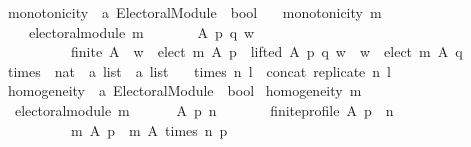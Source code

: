 \begin{isabellebody}
{\isafolddocument}%
%
\isadelimdocument
%
\endisadelimdocument
{}\isamarkupfalse%
\ monotonicity\ {\isacharcolon}{\kern0pt}{\isacharcolon}{\kern0pt}\ {\isachardoublequoteopen}{\isacharprime}{\kern0pt}a\ Electoral{\isacharunderscore}{\kern0pt}Module\ {\isasymRightarrow}\ bool{\isachardoublequoteclose}\ \isanewline
\ \ {\isachardoublequoteopen}monotonicity\ m\ {\isasymequiv}\isanewline
\ \ \ \ electoral{\isacharunderscore}{\kern0pt}module\ m\ {\isasymand}\isanewline
\ \ \ \ \ \ {\isacharparenleft}{\kern0pt}{\isasymforall}A\ p\ q\ w{\isachardot}{\kern0pt}\isanewline
\ \ \ \ \ \ \ \ \ \ {\isacharparenleft}{\kern0pt}finite\ A\ {\isasymand}\ w\ {\isasymin}\ elect\ m\ A\ p\ {\isasymand}\ lifted\ A\ p\ q\ w{\isacharparenright}{\kern0pt}\ {\isasymlongrightarrow}\ w\ {\isasymin}\ elect\ m\ A\ q{\isacharparenright}{\kern0pt}{\isachardoublequoteclose}%
\isadelimdocument
%
\endisadelimdocument
%
\isatagdocument
%
\isamarkuptrue%
%
\endisatagdocument
{\isafolddocument}%
%
\isadelimdocument
%
\endisadelimdocument
{}\isamarkupfalse%
\ times\ {\isacharcolon}{\kern0pt}{\isacharcolon}{\kern0pt}\ {\isachardoublequoteopen}nat\ {\isasymRightarrow}\ {\isacharprime}{\kern0pt}a\ list\ {\isasymRightarrow}\ {\isacharprime}{\kern0pt}a\ list{\isachardoublequoteclose}\ \isanewline
\ \ {\isachardoublequoteopen}times\ n\ l\ {\isacharequal}{\kern0pt}\ concat\ {\isacharparenleft}{\kern0pt}replicate\ n\ l{\isacharparenright}{\kern0pt}{\isachardoublequoteclose}\isanewline
\isanewline
{}\isamarkupfalse%
\ homogeneity\ {\isacharcolon}{\kern0pt}{\isacharcolon}{\kern0pt}\ {\isachardoublequoteopen}{\isacharprime}{\kern0pt}a\ Electoral{\isacharunderscore}{\kern0pt}Module\ {\isasymRightarrow}\ bool{\isachardoublequoteclose}\ \isanewline
{\isachardoublequoteopen}homogeneity\ m\ {\isasymequiv}\isanewline
\ \ electoral{\isacharunderscore}{\kern0pt}module\ m\ {\isasymand}\isanewline
\ \ \ \ {\isacharparenleft}{\kern0pt}{\isasymforall}\ A\ p\ n\ {\isachardot}{\kern0pt}\isanewline
\ \ \ \ \ \ {\isacharparenleft}{\kern0pt}finite{\isacharunderscore}{\kern0pt}profile\ A\ p\ {\isasymand}\ n\ {\isachargreater}{\kern0pt}\ {}\ {\isasymlongrightarrow}\isanewline
\ \ \ \ \ \ \ \ \ \ {\isacharparenleft}{\kern0pt}m\ A\ p\ {\isacharequal}{\kern0pt}\ m\ A\ {\isacharparenleft}{\kern0pt}times\ n\ p{\isacharparenright}{\kern0pt}{\isacharparenright}{\kern0pt}{\isacharparenright}{\kern0pt}{\isacharparenright}{\kern0pt}{\isachardoublequoteclose}\isanewline
%
\isadelimtheory
\isanewline
%
\endisadelimtheory
%
\isatagtheory
{}\isamarkupfalse%
%
\endisatagtheory
{\isafoldtheory}%
%
\isadelimtheory
%
\endisadelimtheory
%
\end{isabellebody}%
